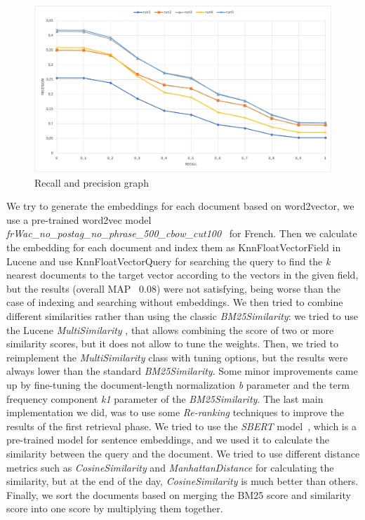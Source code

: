\newpage
\enlargethispage{4\baselineskip}
\begin{figure}[h!]
    \includegraphics[width=\textwidth]{figure/PRgraph.png}
    \caption{Recall and precision graph}
    \label{fig:recallPrecision}
\end{figure}

We try to generate the embeddings for each document based on word2vector, we use a pre-trained word2vec model \textit{frWac\_no\_postag\_no\_phrase\_500\_cbow\_cut100}~\cite{fauconnier_2015} for French. Then we calculate the embedding for each document and index them as KnnFloatVectorField in Lucene and use KnnFloatVectorQuery \cite{lucene-knnvectorfield} for searching the query to find the \textit{k} nearest documents to the target vector according to the vectors in the given field, but the results (overall \ac{MAP} ~0.08) were not satisfying, being worse than the case of indexing and searching without embeddings.
\newline
We then tried to combine different similarities rather than using the classic \textit{BM25Similarity}: we tried to use the Lucene \textit{MultiSimilarity} \cite{lucenemultisimilarity}, that allows combining the score of two or more similarity scores, but it does not allow to
tune the weights. Then, we tried to reimplement the \textit{MultiSimilarity} class with tuning options, but the results were always lower than the standard \textit{BM25Similarity}. Some minor improvements came up by fine-tuning the document-length
normalization \textit{b} parameter and the term frequency component \textit{k1} parameter of the \textit{BM25Similarity}.
\newline
The last main implementation we did, was to use some \textit{Re-ranking} techniques to improve the results of the first retrieval phase.
We tried to use the \textit{SBERT} model~\cite{reimers-2019-sentence-bert}, which is a pre-trained model for sentence embeddings, and we used it to calculate the similarity between the query and the document.
We tried to use different distance metrics such as \textit{CosineSimilarity} \cite{pytorch-cosinesimilarity} and \textit{ManhattanDistance} \cite{dads-manhattandistance} for calculating the similarity, but at the end of the day, \textit{CosineSimilarity} is much better than others.
Finally, we sort the documents based on merging the BM25 score and similarity score into one score by multiplying them together.

